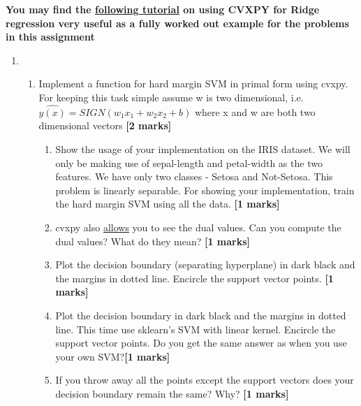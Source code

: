 \documentclass[colorlinks,linkcolor=true]{article}
\begin{document}
\noindent \textbf{You may find the \href{https://www.cvxpy.org/examples/machine_learning/ridge_regression.html}{following tutorial} on using CVXPY for Ridge regression very useful as a fully worked out example for the problems in this assignment}
\begin{enumerate}



\item \begin{enumerate}
	
\item Implement a function for hard margin SVM in primal form using cvxpy. For keeping this task simple assume w is two dimensional, i.e. $\hat{y(x)} = SIGN(w_1x_1 + w_2x_2 + b)$ where x and w are both two dimensional vectors \textbf{[2 marks]}
\begin{enumerate}
	\item Show the usage of your implementation on the IRIS dataset. We will only be making use of sepal-length and petal-width as the two features. We have only two classes - Setosa and Not-Setosa. This problem is linearly separable. For showing your implementation, train the hard margin SVM using all the data. \textbf{[1 marks]}
	\item cvxpy also \href{https://www.cvxpy.org/tutorial/advanced/index.html}{allows} you to see the dual values. Can you compute the dual values? What do they mean? \textbf{[1 marks]}
	\item Plot the decision boundary (separating hyperplane) in dark black and the margins in dotted line. Encircle the support vector points. \textbf{[1 marks]}
	\item Plot the decision boundary in dark black and the margins in dotted line. This time use sklearn's SVM with linear kernel. Encircle the support vector points. Do you get the same answer as when you use your own SVM?\textbf{[1 marks]}
	\item If you throw away all the points except the support vectors does your decision boundary remain the same? Why? \textbf{[1 marks]}
\end{enumerate}


\end{enumerate}
\end{enumerate}
\end{document}
